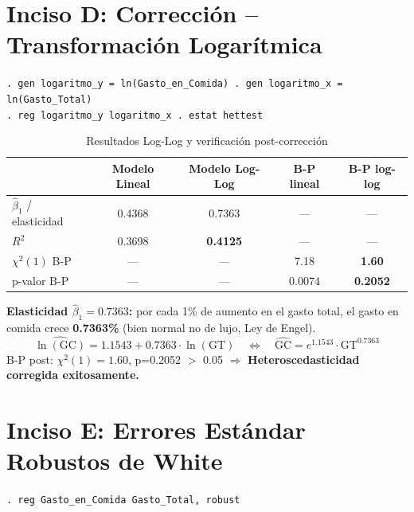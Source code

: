 \documentclass[12pt,a4paper]{article}
\begin{document}
\section{Inciso D: Corrección -- Transformación Logarítmica}

\begin{cajacomando}[title=Stata -- Modelo Log-Log]
\texttt{. gen logaritmo\_y = ln(Gasto\_en\_Comida) \quad . gen logaritmo\_x = ln(Gasto\_Total)}\\
\texttt{. reg logaritmo\_y logaritmo\_x \quad . estat hettest}
\end{cajacomando}

\begin{table}[H]
\centering
\caption{Resultados Log-Log y verificación post-corrección}
\begin{tabular}{lcccc}
\toprule
& \textbf{Modelo Lineal} & \textbf{Modelo Log-Log} & \textbf{B-P lineal} & \textbf{B-P log-log}\\
\midrule
$\hat{\beta}_1$ / elasticidad & 0.4368 & 0.7363 & --- & ---\\
$R^2$ & 0.3698 & \textbf{0.4125} & --- & ---\\
$\chi^2(1)$ B-P & --- & --- & 7.18 & \textbf{1.60}\\
p-valor B-P & --- & --- & 0.0074 & \textbf{0.2052}\\
\bottomrule
\end{tabular}
\end{table}

\begin{cajaconclucion}[title=Interpretación Log-Log]
\textbf{Elasticidad $\hat{\beta}_1 = 0.7363$:} por cada 1\% de aumento en el gasto total,
el gasto en comida crece \textbf{0.7363\%} (bien normal no de lujo, Ley de Engel).
\[
  \widehat{\ln(\text{GC})} = 1.1543 + 0.7363 \cdot \ln(\text{GT})
  \quad\Leftrightarrow\quad
  \widehat{\text{GC}} = e^{1.1543} \cdot \text{GT}^{0.7363}
\]
B-P post: $\chi^2(1)=1.60$, p=0.2052 $>$ 0.05 $\Rightarrow$
\textbf{Heteroscedasticidad corregida exitosamente.}
\end{cajaconclucion}

\section{Inciso E: Errores Estándar Robustos de White}

\begin{cajacomando}[title=Stata -- Errores Robustos]
\texttt{. reg Gasto\_en\_Comida Gasto\_Total, robust}
\end{cajacomando}
\end{document}
